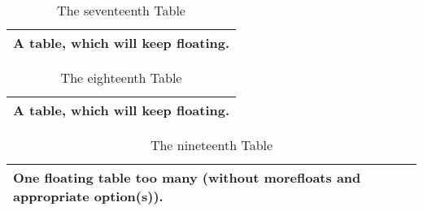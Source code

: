 \documentclass[british]{article}[2007/10/19]%
\begin{document}
\begin{table}[t] \centering%
\begin{tabular}{|l|}
\hline
A table, which will keep floating.\\ \hline
\end{tabular}%
\caption{The seventeenth Table}%
\end{table}%

\begin{table}[t] \centering%
\begin{tabular}{|l|}
\hline
A table, which will keep floating.\\ \hline
\end{tabular}%
\caption{The eighteenth Table}%
\end{table}%

\begin{table}[t] \centering%
\begin{tabular}{|l|}
\hline
One floating table too many
(without \textsf{morefloats} and appropriate option(s)).\\ \hline
\end{tabular}%
\caption{The nineteenth Table}%
\end{table}%
\end{document}
